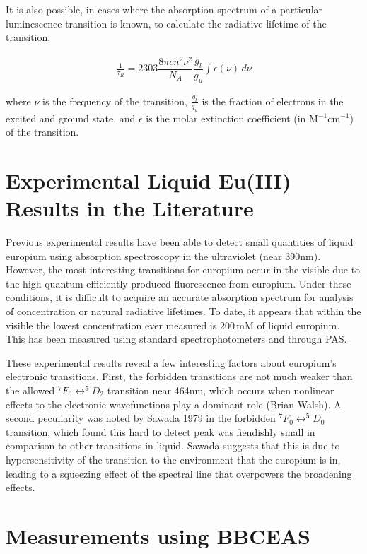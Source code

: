 It is also possible, in cases where the absorption spectrum of a particular
luminescence transition is known, to calculate the radiative lifetime of the
transition,

\begin{align}
  \frac{1}{\tau_R} = 2303 \dfrac{8\pi c n ^2 \nu^2}{N_A}\dfrac{g_l}{g_u}\int\epsilon(\nu)\,d\nu \label{eq:nat_life_abs}
\end{align}

where $\nu$ is the frequency of the transition, $\tfrac{g_l}{g_u}$ is the
fraction of electrons in the excited and ground state, and $\epsilon$ is the
molar extinction coefficient (in M$^{-1}$cm$^{-1}$) of the transition.

\section{Experimental Liquid Eu(III) Results in the Literature}\label{sec:previous_eu_results}

Previous experimental results have been able to detect small quantities of
liquid europium using absorption spectroscopy in the ultraviolet (near 390nm).
However, the most interesting transitions for europium occur in the visible
due to the high quantum efficiently produced fluorescence from europium. Under
these conditions, it is difficult to acquire an accurate absorption spectrum
for analysis of concentration or natural radiative lifetimes. To date, it
appears that within the visible the lowest concentration ever measured is
200\,mM of liquid europium. This has been measured using standard spectrophotometers and through \ac{PAS}.

These experimental results reveal a few interesting factors about europium's
electronic transitions. First, the forbidden transitions are not much weaker
than the allowed $^7F_0 \leftrightarrow ^5D_2$ transition near 464nm, which
occurs when nonlinear effects to the electronic wavefunctions play a dominant
role (Brian Walsh). A second peculiarity was noted by Sawada 1979 in the
forbidden $^7F_0 \leftrightarrow ^5D_0$ transition, which found this hard to
detect peak was fiendishly small in comparison to other transitions in liquid.
Sawada suggests that this is due to hypersensitivity of the transition to the
environment that the europium is in, leading to a squeezing effect of the
spectral line that overpowers the broadening effects.

\section{Measurements using BBCEAS}\label{sec:eu_measurements}

